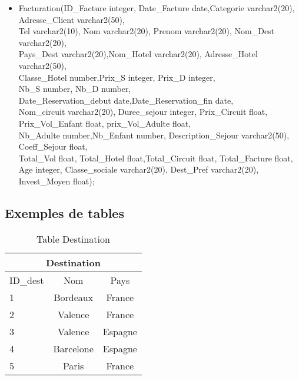 \begin{itemize}
\item Facturation(ID\_Facture integer, Date\_Facture date,Categorie varchar2(20), Adresse\_Client varchar2(50),\\
	 Tel varchar2(10), Nom varchar2(20), Prenom varchar2(20), Nom\_Dest varchar2(20), \\
	 Pays\_Dest varchar2(20),Nom\_Hotel varchar2(20), Adresse\_Hotel varchar2(50),\\
	 Classe\_Hotel number,Prix\_S integer, Prix\_D integer,\\
	 Nb\_S number, Nb\_D number,\\ 
	 Date\_Reservation\_debut date,Date\_Reservation\_fin date, \\
	 Nom\_circuit varchar2(20), Duree\_sejour integer, Prix\_Circuit float, \\
	 Prix\_Vol\_Enfant float, prix\_Vol\_Adulte float,\\
	 Nb\_Adulte number,Nb\_Enfant number, Description\_Sejour varchar2(50), Coeff\_Sejour float, \\
	 Total\_Vol float, Total\_Hotel float,Total\_Circuit float, Total\_Facture float, \\
	 Age integer, Classe\_sociale varchar2(20), Dest\_Pref varchar2(20), Invest\_Moyen float);\\
\end{itemize}
\newpage

\subsection{Exemples de tables}


\begin{table}[h]
\begin{center}
\begin{tabular}{|l|c|c|}
\hline
\multicolumn{3}{|c|}{Destination}\\
\hline
ID\_dest& Nom & Pays \\
\hline
1 & Bordeaux& France\\
\hline
2 & Valence& France\\
\hline
3 & Valence& Espagne\\
\hline
4 & Barcelone& Espagne\\
\hline
5 & Paris& France\\
\hline
\end{tabular}
\end{center}
\caption{Table Destination}
\end{table}

